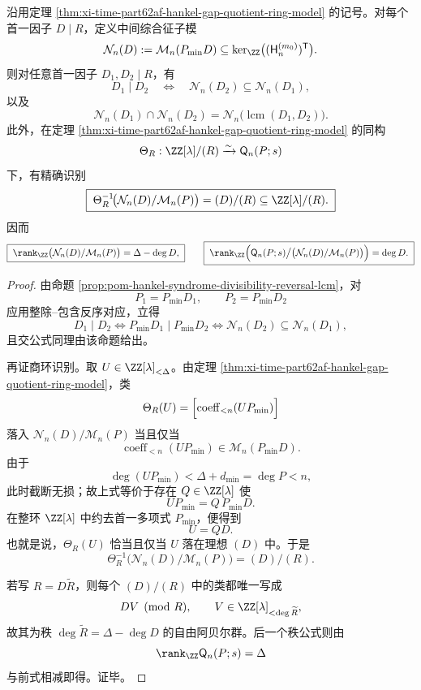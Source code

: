 \begin{theorem}[过拟合综合征层级的除子格分类]\label{thm:xi-time-part62af-hankel-gap-divisor-lattice}
沿用定理 \ref{thm:xi-time-part62af-hankel-gap-quotient-ring-model} 的记号。对每个首一因子 \(D\mid R\)，定义中间综合征子模
\[
\mathcal N_n(D):=\mathcal M_n(P_{\min}D)
\subseteq
\ker_{\ZZ}\bigl((\mathsf H^{(m_0)}_n)^{\mathsf T}\bigr).
\]
则对任意首一因子 \(D_1,D_2\mid R\)，有
\[
\boxed{\;
D_1\mid D_2
\quad\Longleftrightarrow\quad
\mathcal N_n(D_2)\subseteq \mathcal N_n(D_1),\;}
\]
以及
\[
\boxed{\;
\mathcal N_n(D_1)\cap \mathcal N_n(D_2)
=
\mathcal N_n\bigl(\operatorname{lcm}(D_1,D_2)\bigr).\;}
\]
此外，在定理 \ref{thm:xi-time-part62af-hankel-gap-quotient-ring-model} 的同构
\[
\Theta_R:\ZZ[\lambda]/(R)\xrightarrow{\sim}\mathsf Q_n(P;s)
\]
下，有精确识别
\[
\boxed{\;
\Theta_R^{-1}\!\bigl(\mathcal N_n(D)/\mathcal M_n(P)\bigr)
=
(D)/(R)\subseteq \ZZ[\lambda]/(R).\;}
\]
因而
\[
\boxed{\;
\rank_{\ZZ}\bigl(\mathcal N_n(D)/\mathcal M_n(P)\bigr)
=
\Delta-\deg D,\;}
\qquad
\boxed{\;
\rank_{\ZZ}\Bigl(\mathsf Q_n(P;s)\big/\bigl(\mathcal N_n(D)/\mathcal M_n(P)\bigr)\Bigr)
=
\deg D.\;}
\]
\end{theorem}
\begin{proof}
由命题 \ref{prop:pom-hankel-syndrome-divisibility-reversal-lcm}，对
\[
P_1=P_{\min}D_1,
\qquad
P_2=P_{\min}D_2
\]
应用整除--包含反序对应，立得
\[
D_1\mid D_2
\iff
P_{\min}D_1\mid P_{\min}D_2
\iff
\mathcal N_n(D_2)\subseteq \mathcal N_n(D_1),
\]
且交公式同理由该命题给出。

再证商环识别。取 \(U\in \ZZ[\lambda]_{<\Delta}\)。由定理
\ref{thm:xi-time-part62af-hankel-gap-quotient-ring-model}，类
\[
\Theta_R(U)
=
\Bigl[\operatorname{coeff}_{<n}(U P_{\min})\Bigr]
\]
落入 \(\mathcal N_n(D)/\mathcal M_n(P)\) 当且仅当
\[
\operatorname{coeff}_{<n}(U P_{\min})\in \mathcal M_n(P_{\min}D).
\]
由于
\[
\deg(UP_{\min})<\Delta+d_{\min}=\deg P<n,
\]
此时截断无损；故上式等价于存在 \(Q\in\ZZ[\lambda]\) 使
\[
U P_{\min}=Q\,P_{\min}D.
\]
在整环 \(\ZZ[\lambda]\) 中约去首一多项式 \(P_{\min}\)，便得到
\[
U=Q D.
\]
也就是说，\(\Theta_R(U)\) 恰当且仅当 \(U\) 落在理想 \((D)\) 中。于是
\[
\Theta_R^{-1}\!\bigl(\mathcal N_n(D)/\mathcal M_n(P)\bigr)=(D)/(R).
\]

若写 \(R=D\widetilde R\)，则每个 \((D)/(R)\) 中的类都唯一写成
\[
D V\pmod R,
\qquad
V\in\ZZ[\lambda]_{<\deg\widetilde R},
\]
故其为秩 \(\deg\widetilde R=\Delta-\deg D\) 的自由阿贝尔群。后一个秩公式则由
\[
\rank_{\ZZ}\mathsf Q_n(P;s)=\Delta
\]
与前式相减即得。证毕。
\end{proof}

